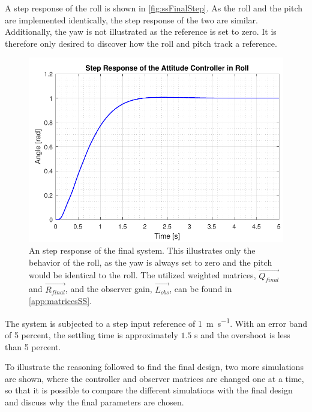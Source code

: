 A step response of the roll is shown in \autoref{fig:ssFinalStep}. As the roll and the pitch are implemented identically, the step response of the two are similar. Additionally, the yaw is not illustrated as the reference is set to zero. It is therefore only desired to discover how the roll and pitch track a reference. 
%
\begin{figure}[H]
	\centering
	\includegraphics[scale=0.8]{figures/ssFinalStep.pdf}
	\caption{An step response of the final system. This illustrates only the behavior of the roll, as the yaw is always set to zero and the pitch would be identical to the roll. The utilized weighted matrices, $\vec{Q_{final}}$ and $\vec{R_{final}}$, and the observer gain, $\vec{L_{obs}}$, can be found in \autoref{app:matricesSS}.}
	\label{fig:ssFinalStep}
\end{figure}
%
The system is subjected to a step input reference of \SI{1}{m s^{-1}}. With an error band of 5 percent, the settling time is approximately $1.5$ \si{s} and the overshoot is less than 5 percent. 

To illustrate the reasoning followed to find the final design, two more simulations are shown, where the controller and observer matrices are changed one at a time, so that it is possible to compare the different simulations with the final design and discuss why the final parameters are chosen.

